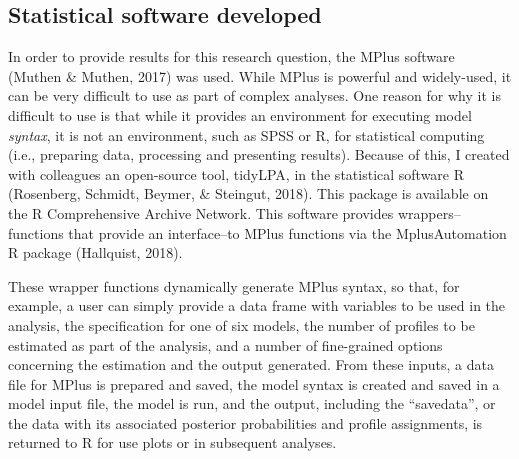 \documentclass[]{book}
\theoremstyle{definition}
\theoremstyle{definition}
\theoremstyle{definition}
\theoremstyle{remark}
\begin{document}
\subsection{Statistical software
developed}\label{statistical-software-developed-1}

In order to provide results for this research question, the MPlus
software (Muthen \& Muthen, 2017) was used. While MPlus is powerful and
widely-used, it can be very difficult to use as part of complex
analyses. One reason for why it is difficult to use is that while it
provides an environment for executing model \emph{syntax}, it is not an
environment, such as SPSS or R, for statistical computing (i.e.,
preparing data, processing and presenting results). Because of this, I
created with colleagues an open-source tool, tidyLPA, in the statistical
software R (Rosenberg, Schmidt, Beymer, \& Steingut, 2018). This package
is available on the R Comprehensive Archive Network. This software
provides wrappers--functions that provide an interface--to MPlus
functions via the MplusAutomation R package (Hallquist, 2018).

These wrapper functions dynamically generate MPlus syntax, so that, for
example, a user can simply provide a data frame with variables to be
used in the analysis, the specification for one of six models, the
number of profiles to be estimated as part of the analysis, and a number
of fine-grained options concerning the estimation and the output
generated. From these inputs, a data file for MPlus is prepared and
saved, the model syntax is created and saved in a model input file, the
model is run, and the output, including the ``savedata'', or the data
with its associated posterior probabilities and profile assignments, is
returned to R for use plots or in subsequent analyses.
\end{document}
